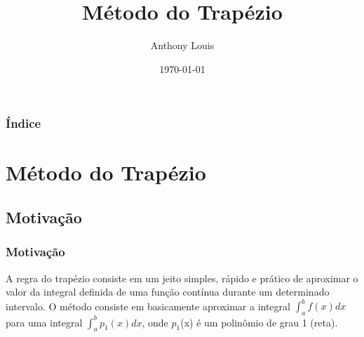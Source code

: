 \documentclass{beamer}
\title[Método do Trapézio]{Método do Trapézio } %
\author{Anthony Louis} %
\institute[UnB] %
{
	Universidade de Brasília \\ %
	\medskip
	\textit{anthonyferreira10@yahoo.com.br} %
}
\date{\today} %
\begin{document}
	
	\begin{frame}
	\titlepage %
\end{frame}

\begin{frame}
	\frametitle{Índice} %
	\tableofcontents %
\end{frame}


\section{Método do Trapézio} %

\subsection{Motivação}

\begin{frame}
	\frametitle{Motivação}
	A regra do trapézio consiste em um jeito simples, rápido e prático de aproximar o valor da integral definida de uma função contínua durante um determinado intervalo. O método consiste em basicamente aproximar a integral $\int_{a}^{b}f\left(x\right)dx$ para uma integral $\int_{a}^{b}p_1\left(x\right)dx$, onde $p_1$(x) é um polinômio de grau 1 (reta). 
\end{frame}
\end{document}
